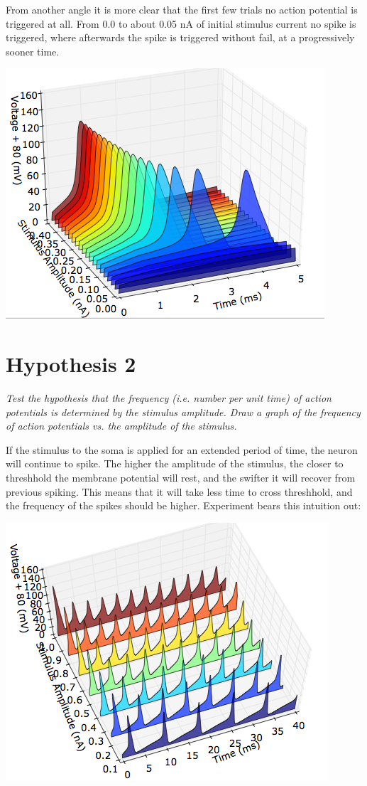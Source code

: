 \documentclass[12pt]{article}
\begin{document}
From another angle it is more clear that the first few trials no action potential is triggered at all.  From 0.0 to about 0.05 nA of initial stimulus current no spike is triggered, where afterwards the spike is triggered without fail, at a progressively sooner time.

\includegraphics[scale=0.6]{stimulusamp-side.png}

\section{Hypothesis 2}

\emph{Test the hypothesis that the frequency (i.e. number per unit time) of action potentials is determined by the stimulus amplitude.  Draw a graph of the frequency of action potentials vs. the amplitude of the stimulus.}

\vspace{10pt}

If the stimulus to the soma is applied for an extended period of time, the neuron will continue to spike.  The higher the amplitude of the stimulus, the closer to threshhold the membrane potential will rest, and the swifter it will recover from previous spiking.  This means that it will take less time to cross threshhold, and the frequency of the spikes should be higher.  Experiment bears this intuition out:

\includegraphics[scale=0.6]{frequency.png}
\end{document}
